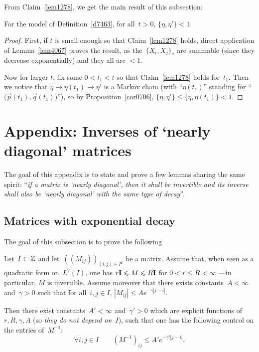 From Claim~\ref{lem1278}, we get the main result of this subsection:
%
\begin{Thm}\label{thmParis}
For the model of Definition~\ref{d7463}, for all~$t>0$, $\{\eta,\eta'\} < 1$.
\end{Thm}

\begin{proof}
First, if $t$ is small enough so that Claim~\ref{lem1278} holds,
direct application of Lemma~\ref{lem4067} proves the result,
as the~$\{X_i,X_j\}_*$ are summable (since they decrease exponentially)
and they all are $<1$.

Now for larger $t$, fix some $0<t_1<t$ so that Claim~\ref{lem1278} holds for~$t_1$.
Then we notice that $\eta \to \eta(t_1) \to \eta'$ is a Markov chain
(with ``$\eta(t_1)$'' standing for ``$\big(\vec{p}(t_1),\vec{q}(t_1)\big)$''),
so by Proposition~\ref{cor0706}, $\{\eta,\eta'\} \leq \{\eta,\eta(t_1)\} < 1$.
\end{proof}




\section{Appendix: Inverses of `nearly diagonal' matrices}%
\label{parInversesOfDiagonalConcentratedMatrices}

The goal of this appendix is to state and prove a few lemmas sharing the same spirit:
``\emph{if a matrix is `nearly diagonal', then it shall be invertible
and its inverse shall also be `nearly diagonal' with the same type of decay}''.

\subsection{Matrices with exponential decay}

The goal of this subsection is to prove the following
%
\begin{Lem}\label{lem4060}
Let~$I \subset \mathbb{Z}$ and let~$(\!(M_{ij})\!)_{(i,j)\in I^2}$ be a matrix.
Assume that, when seen as a quadratic form on~$L^2(I)$, one has
$r\mathbf{I} \leqslant M \leqslant R\mathbf{I}$ for $0<r\leq R<\infty$ —in particular, $M$ is invertible.
Assume moreover that there exists constants~$A < \infty$ and~$\gamma > 0$ such that
for all~$i,j\in I$, $|M_{ij}| \leq A e^{-\gamma|j-i|}$.

Then there exist constants~$A' < \infty$ and~$\gamma' > 0$
which are explicit functions of~$r,R,\gamma,A$ (so \emph{they do not depend on~$I$}),
such that one has the following control on the entries of~$M^{-1}$:
\[ \forall i,j \in I \qquad (M^{-1})_{ij} \leq A' e^{-\gamma'|j-i|} .\]
\end{Lem}


